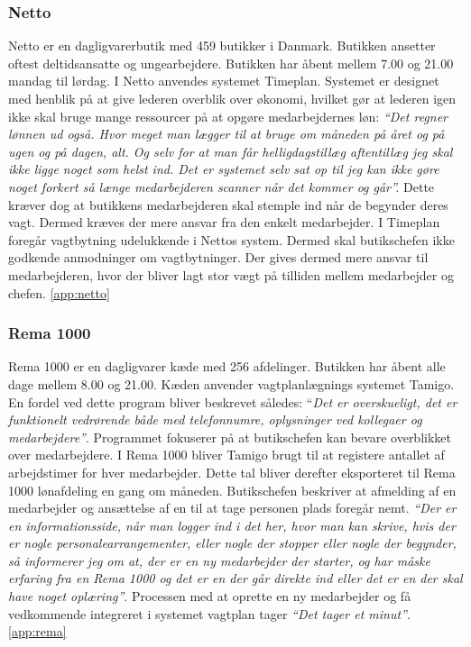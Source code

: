\subsubsection{Netto}
Netto er en dagligvarerbutik med 459 butikker i Danmark. Butikken ansetter oftest deltidsansatte og ungearbejdere. Butikken har åbent mellem 7.00 og 21.00 mandag til lørdag. I Netto anvendes systemet Timeplan. Systemet er designet med henblik på at give lederen overblik over økonomi, hvilket gør at lederen igen ikke skal bruge mange ressourcer på at opgøre medarbejdernes løn:\textit{ “Det regner lønnen ud også. Hvor meget man lægger til at bruge om måneden på året og på ugen og på dagen, alt. Og selv for at man får helligdagstillæg aftentillæg jeg skal ikke ligge noget som helst ind. Det er systemet selv sat op til jeg kan ikke gøre noget forkert så længe medarbejderen scanner når det kommer og går”.} Dette kræver dog at butikkens medarbejderen skal stemple ind når de begynder deres vagt. Dermed kræves der mere ansvar fra den enkelt medarbejder. I Timeplan foregår vagtbytning udelukkende i Nettos system. Dermed skal butikschefen ikke godkende anmodninger om vagtbytninger. Der gives dermed mere ansvar til medarbejderen, hvor der bliver lagt stor vægt på tilliden mellem medarbejder og chefen. \ref{app:netto}

\subsubsection{Rema 1000}
Rema 1000 er en dagligvarer kæde med 256 afdelinger. Butikken har åbent alle dage mellem 8.00 og 21.00. Kæden anvender vagtplanlægnings systemet  Tamigo. En fordel ved dette program bliver beskrevet således: “\textit{Det er overskueligt, det er funktionelt vedrørende både med telefonnumre, oplysninger ved kollegaer og medarbejdere”}. Programmet fokuserer på at butikschefen kan bevare overblikket over medarbejdere. I Rema 1000 bliver Tamigo brugt til at registere antallet af arbejdstimer for hver medarbejder. Dette tal bliver derefter eksporteret til Rema 1000 lønafdeling en gang om måneden. Butikschefen beskriver at afmelding af en medarbejder og ansættelse af en til at tage personen plads foregår nemt.
\textit{“Der er en informationsside, når man logger ind i det her, hvor man kan skrive, hvis der er nogle personalearrangementer, eller nogle der stopper eller nogle der begynder, så informerer jeg om at, der er en ny medarbejder der starter, og har måske erfaring fra en Rema 1000 og det er en der går direkte ind eller det er en der skal have noget oplæring”}. Processen med at oprette en ny medarbejder og få vedkommende integreret i systemet vagtplan tager \textit{“Det tager et minut”}. \ref{app:rema}

